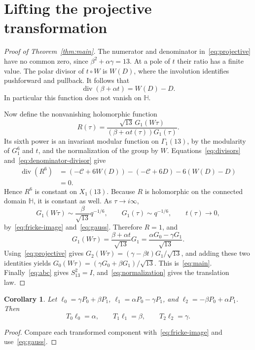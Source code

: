 \documentclass[11pt]{amsart}
\newtheorem{corollary}[theorem]{Corollary}
\theoremstyle{remark}
\DeclareMathOperator{\divisor}{div}
\newcommand{\HH}{\mathbb H}
\begin{document}
\section{Lifting the projective transformation}
\begin{proof}[Proof of Theorem~\ref{thm:main}]
The numerator and denominator in~\eqref{eq:projective} have no common zero, since $\beta^2+\alpha\gamma=13$. At a pole of $t$ their ratio has a finite value. The polar divisor of $t\circ W$ is $W(D)$, where the involution identifies pushforward and pullback. It follows that
\begin{equation}\label{eq:denominator-divisor}
 \divisor(\beta+\alpha t)=W(D)-D.
\end{equation}
In particular this function does not vanish on $\HH$.

Now define the nonvanishing holomorphic function
\[
 R(\tau)=\frac{\sqrt{13}\,G_1(W\tau)}{(\beta+\alpha t(\tau))G_1(\tau)}.
\]
Its sixth power is an invariant modular function on $\Gamma_1(13)$, by the modularity of $G_1^6$ and $t$, and the normalization of the group by $W$. Equations~\eqref{eq:divisors} and~\eqref{eq:denominator-divisor} give
\begin{align*}
 \divisor(R^6)
 &=(-\mathcal C+6W(D))-(-\mathcal C+6D)-6(W(D)-D)\\
 &=0.
\end{align*}
Hence $R^6$ is constant on $X_1(13)$. Because $R$ is holomorphic on the connected domain $\HH$, it is constant as well. As $\tau\to i\infty$,
\[
 G_1(W\tau)\sim\frac{\beta}{\sqrt{13}}q^{-1/6},\qquad
 G_1(\tau)\sim q^{-1/6},\qquad t(\tau)\to0,
\]
by~\eqref{eq:fricke-image} and~\eqref{eq:gauss}. Therefore $R=1$, and
\[
 G_1(W\tau)=\frac{\beta+\alpha t}{\sqrt{13}}G_1
 =\frac{\alpha G_0-\gamma G_1}{\sqrt{13}}.
\]
Using~\eqref{eq:projective} gives
$G_2(W\tau)=(\gamma-\beta t)G_1/\sqrt{13}$, and adding these two identities yields
$G_0(W\tau)=(\gamma G_0+\beta G_1)/\sqrt{13}$.
This is~\eqref{eq:main}. Finally~\eqref{eq:abc} gives $S_{13}^2=I$, and~\eqref{eq:normalization} gives the translation law.
\end{proof}

\begin{corollary}\label{cor:twisted}
Let $\ell_0=\gamma P_0+\beta P_1$, $\ell_1=\alpha P_0-\gamma P_1$, and $\ell_2=-\beta P_0+\alpha P_1$. Then
\[
 T_0\ell_0=\alpha,\qquad T_1\ell_1=\beta,\qquad T_2\ell_2=\gamma.
\]
\end{corollary}
\begin{proof}
Compare each transformed component with~\eqref{eq:fricke-image} and use~\eqref{eq:gauss}.
\end{proof}
\end{document}

